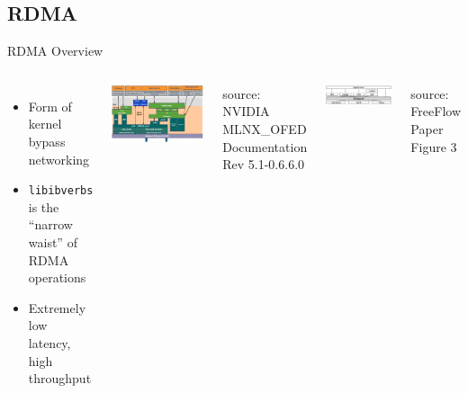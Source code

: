 \documentclass{beamer}
\begin{document}
\subsection{RDMA}
\begin{frame}{RDMA Overview}
    \begin{columns}
    \begin{itemize}
        \item Form of kernel bypass networking
        \item \texttt{libibverbs} is the ``narrow waist'' of RDMA operations
        \item Extremely low latency, high throughput
    \end{itemize}
        \includegraphics[width=\textwidth]{ibverbsstack.png}
        \vspace{-25pt}
        \begin{center}
            \fontsize{4pt}{4pt}\selectfont source: NVIDIA MLNX\_OFED Documentation Rev 5.1-0.6.6.0
        \end{center}
        \includegraphics[width=\textwidth]{freeflowibverbsstack.png}
        \vspace{-25pt}
        \begin{center}
            \fontsize{4pt}{4pt}\selectfont source: FreeFlow Paper Figure 3
        \end{center}
    \end{columns}
\end{frame}
\end{document}
